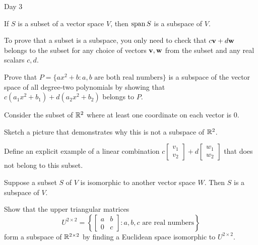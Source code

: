 \begin{applicationActivities}{Day 3}
\begin{fact}
  If \(S\) is a subset of a vector space \(V\), then
  \(\operatorname{span} S\) is a subspace of \(V\).
\end{fact}

\begin{remark}
  To prove that a subset is a subspace, you only need to check that
  \(c\mathbf v+d\mathbf w\) belongs to the subset for any choice of
  vectors \(\mathbf v,\mathbf w\) from the subset and any real scalars \(c,d\).
\end{remark}

\begin{activity}{5}
  Prove that \(P=\{ax^2+b:a,b\text{ are both real numbers}\}\) is a subspace
  of the vector space of all degree-two polynomials by showing that
  \(c(a_1x^2+b_1)+d(a_2x^2+b_2)\) belongs to \(P\).
\end{activity}

\begin{activity}{10}
  Consider the subset of \(\mathbb{R}^2\) where at least one coordinate on
  each vector is \(0\).
  \begin{center}
  \end{center}
  \begin{subactivity}
  Sketch a picture that demonstrates why this is not a subspace of \(\mathbb{R}^2\).
  \end{subactivity}
  \begin{subactivity}
    Define an explicit example of a linear combination
    \(c\begin{bmatrix}v_1\\v_2\end{bmatrix}+
    d\begin{bmatrix}w_1\\w_2\end{bmatrix}\) that does not
    belong to this subset.
  \end{subactivity}
\end{activity}

\begin{fact}
  Suppose a subset \(S\) of \(V\) is isomorphic to another vector space
  \(W\).
  Then \(S\) is a subspace of \(V\).
\end{fact}

\begin{activity}{10}
  Show that the upper triangular matrices
  \[U^{2\times 2}=
    \left\{
    \begin{bmatrix}a&b\\0&c\end{bmatrix} :
    a,b,c\text{ are real numbers}
    \right\}
  \]
  form a subspace of \(\mathbb{R}^{2\times 2}\) by finding a Euclidean
  space isomorphic to \(U^{2\times 2}\).
\end{activity}



\end{applicationActivities}
